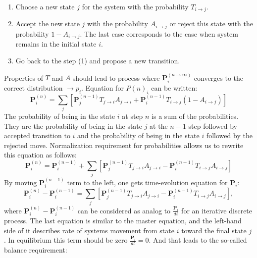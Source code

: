 \documentclass[twoside,english]{uiofysmaster}
\begin{document}
\begin{enumerate}
	\item Choose a new state $j$ for the system with the probability $T_{i\rightarrow j}$.
	\item Accept the new state $j$ with the probability $A_{i\rightarrow j}$ or reject this state with the probability $1-A_{i\rightarrow j}$. The last case corresponds to the case when system remains in the initial state $i$.
	\item Go back to the step (1) and propose a new transition.
\end{enumerate}

Properties of $T$ and $A$ should lead to process where $\mathbf{P}_i^{(n\rightarrow \infty)} $ converges to the correct distribution $\rightarrow p_i$.
Equation for $ P(n)_i$ can be written:
\begin{equation}
\mathbf{P}^{(n)}_i = \sum_j \left [
\mathbf{P}^{(n-1)}_jT_{j\rightarrow i} A_{j\rightarrow i} 
+\mathbf{P}^{(n-1)}_iT_{i\rightarrow j}\left ( 1- A_{i\rightarrow j} \right)
\right ]
\end{equation}
The probability of being in the state $i$ at step $n$ is a sum of the probabilities. They are the probability of being in the state $j$ at the $n-1$ step followed by accepted transition to $i$  and the probability of being in the state $i$ followed by the rejected move.
Normalization requirement for probabilities allows us to rewrite this equation as follows:
\begin{equation}
\mathbf{P}^{(n)}_i = \mathbf{P}^{(n-1)}_i +
\sum_j \left [
\mathbf{P}^{(n-1)}_jT_{j\rightarrow i} A_{j\rightarrow i} 
-\mathbf{P}^{(n-1)}_iT_{i\rightarrow j}A_{i\rightarrow j}
\right ] 
\end{equation}
By moving $\mathbf{P}^{(n-1)}_i$ term to the left, one gets time-evolution equation for $\mathbf{P}_i$:
\begin{equation}
\mathbf{P}^{(n)}_i - \mathbf{P}^{(n-1)}_i = 
\sum_j \left [
\mathbf{P}^{(n-1)}_jT_{j\rightarrow i} A_{j\rightarrow i} 
-\mathbf{P}^{(n-1)}_iT_{i\rightarrow j}A_{i\rightarrow j}
\right ] ,
\end{equation}
where $\mathbf{P}^{(n)}_i - \mathbf{P}^{(n-1)}_i$ can be considered as analog to $\frac {\mathbf{P}_i}{dt}$ for an iterative discrete process. The last equation is similar to the master equation, and the left-hand side of it describes rate of systems movement from state $i$ toward the final state $j$. In equilibrium this term should be zero $\frac {\mathbf{P}_i}{dt}=0$. And that leads to the so-called balance requirement: 
\end{document}
